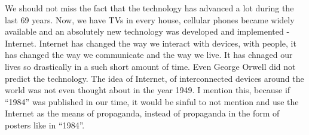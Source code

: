 \documentclass[a4paper,12pt]{article}
\begin{document}
We should not miss the fact that the technology has advanced a lot during the last 69 years. Now, we have TVs in every house, cellular phones became widely available and an absolutely new technology was developed and implemented - Internet. Internet has changed the way we interact with devices, with people, it has changed the way we communicate and the way we live. It has chnaged our lives so drastically in a such short amount of time. Even George Orwell did not predict the technology. The idea of Internet, of interconnected devices around the world was not even thought about in the year 1949. I mention this, because if ``1984'' was published in our time, it would be sinful to not mention and use the Internet as the means of propaganda, instead of propaganda in the form of posters like in ``1984''.\\


\newpage


\end{document}
